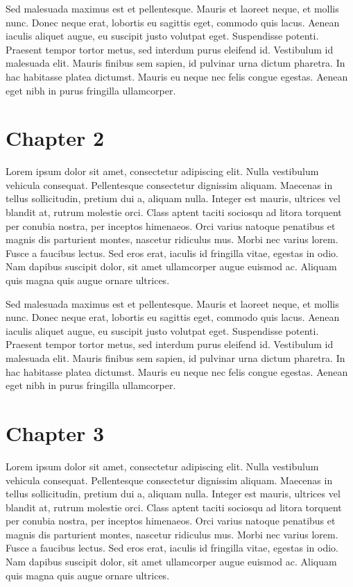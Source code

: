 \documentclass[
  12pt,
  letterpaper,
  oneside,
  open=any]{scrbook}
\begin{document}
Sed malesuada maximus est et pellentesque. Mauris et laoreet neque, et
mollis nunc. Donec neque erat, lobortis eu sagittis eget, commodo quis
lacus. Aenean iaculis aliquet augue, eu suscipit justo volutpat eget.
Suspendisse potenti. Praesent tempor tortor metus, sed interdum purus
eleifend id. Vestibulum id malesuada elit. Mauris finibus sem sapien, id
pulvinar urna dictum pharetra. In hac habitasse platea dictumst. Mauris
eu neque nec felis congue egestas. Aenean eget nibh in purus fringilla
ullamcorper.


\hypertarget{chapter-2}{%
\chapter{Chapter 2}\label{chapter-2}}

Lorem ipsum dolor sit amet, consectetur adipiscing elit. Nulla
vestibulum vehicula consequat. Pellentesque consectetur dignissim
aliquam. Maecenas in tellus sollicitudin, pretium dui a, aliquam nulla.
Integer est mauris, ultrices vel blandit at, rutrum molestie orci. Class
aptent taciti sociosqu ad litora torquent per conubia nostra, per
inceptos himenaeos. Orci varius natoque penatibus et magnis dis
parturient montes, nascetur ridiculus mus. Morbi nec varius lorem. Fusce
a faucibus lectus. Sed eros erat, iaculis id fringilla vitae, egestas in
odio. Nam dapibus suscipit dolor, sit amet ullamcorper augue euismod ac.
Aliquam quis magna quis augue ornare ultrices.

Sed malesuada maximus est et pellentesque. Mauris et laoreet neque, et
mollis nunc. Donec neque erat, lobortis eu sagittis eget, commodo quis
lacus. Aenean iaculis aliquet augue, eu suscipit justo volutpat eget.
Suspendisse potenti. Praesent tempor tortor metus, sed interdum purus
eleifend id. Vestibulum id malesuada elit. Mauris finibus sem sapien, id
pulvinar urna dictum pharetra. In hac habitasse platea dictumst. Mauris
eu neque nec felis congue egestas. Aenean eget nibh in purus fringilla
ullamcorper.


\hypertarget{chapter-3}{%
\chapter{Chapter 3}\label{chapter-3}}

Lorem ipsum dolor sit amet, consectetur adipiscing elit. Nulla
vestibulum vehicula consequat. Pellentesque consectetur dignissim
aliquam. Maecenas in tellus sollicitudin, pretium dui a, aliquam nulla.
Integer est mauris, ultrices vel blandit at, rutrum molestie orci. Class
aptent taciti sociosqu ad litora torquent per conubia nostra, per
inceptos himenaeos. Orci varius natoque penatibus et magnis dis
parturient montes, nascetur ridiculus mus. Morbi nec varius lorem. Fusce
a faucibus lectus. Sed eros erat, iaculis id fringilla vitae, egestas in
odio. Nam dapibus suscipit dolor, sit amet ullamcorper augue euismod ac.
Aliquam quis magna quis augue ornare ultrices.
\end{document}

